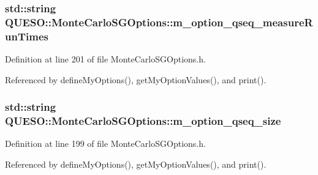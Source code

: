\hypertarget{class_q_u_e_s_o_1_1_monte_carlo_s_g_options_a16456d0bcab4d4aca08b02f0ce123b07}{
\subsubsection[{m\-\_\-option\-\_\-qseq\-\_\-measure\-Run\-Times}]{\setlength{\rightskip}{0pt plus 5cm}std\-::string Q\-U\-E\-S\-O\-::\-Monte\-Carlo\-S\-G\-Options\-::m\-\_\-option\-\_\-qseq\-\_\-measure\-Run\-Times\hspace{0.3cm}{\ttfamily [private]}}}\label{class_q_u_e_s_o_1_1_monte_carlo_s_g_options_a16456d0bcab4d4aca08b02f0ce123b07}


Definition at line 201 of file Monte\-Carlo\-S\-G\-Options.\-h.



Referenced by define\-My\-Options(), get\-My\-Option\-Values(), and print().

\hypertarget{class_q_u_e_s_o_1_1_monte_carlo_s_g_options_ab720df7bb4ec0dbffd231de174d30423}{
\subsubsection[{m\-\_\-option\-\_\-qseq\-\_\-size}]{\setlength{\rightskip}{0pt plus 5cm}std\-::string Q\-U\-E\-S\-O\-::\-Monte\-Carlo\-S\-G\-Options\-::m\-\_\-option\-\_\-qseq\-\_\-size\hspace{0.3cm}{\ttfamily [private]}}}\label{class_q_u_e_s_o_1_1_monte_carlo_s_g_options_ab720df7bb4ec0dbffd231de174d30423}


Definition at line 199 of file Monte\-Carlo\-S\-G\-Options.\-h.



Referenced by define\-My\-Options(), get\-My\-Option\-Values(), and print().

